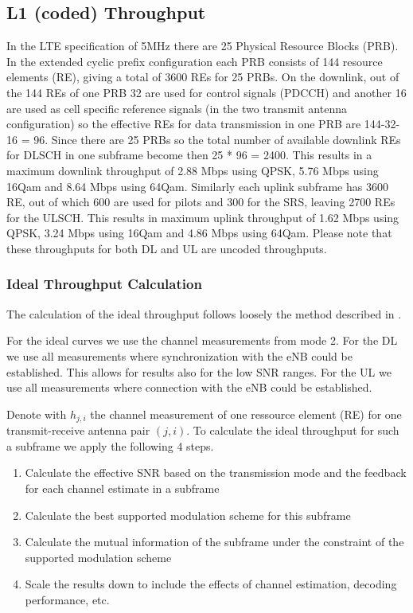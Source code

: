 \documentclass[a4paper,10pt]{article}
\begin{document}
\subsection{L1 (coded) Throughput}
\label{sec:tp}

In the LTE specification of 5MHz there are 25 Physical Resource Blocks (PRB). In the extended cyclic prefix configuration each PRB consists of 144 resource elements (RE), giving a total of 3600 REs for 25 PRBs. On the downlink, out of the 144 REs of one PRB 32 are used for control signals (PDCCH) and another 16 are used as cell specific reference signals (in the two transmit antenna configuration) so the effective REs for data transmission in one PRB are 144-32-16 = 96. Since there are 25 PRBs so the total number of available downlink REs for DLSCH in one subframe become then 25 * 96 = 2400. This results in a maximum downlink throughput of 2.88 Mbps using QPSK, 5.76 Mbps using 16Qam and 8.64 Mbps using 64Qam. Similarly each uplink subframe has 3600 RE, out of which 600 are used for pilots and 300 for the SRS, leaving 2700 REs for the ULSCH. This results in maximum uplink throughput of 1.62 Mbps using QPSK, 3.24 Mbps using 16Qam and 4.86 Mbps using 64Qam. Please note that these throughputs for both DL and UL are uncoded throughputs. 

\subsubsection{Ideal Throughput Calculation}
The calculation of the ideal throughput follows loosely the method described in \cite{IEEE802.16m_EMD}. 

For the ideal curves we use the channel measurements from mode 2. For the DL we use all measurements where synchronization with the eNB could be established. This allows for results also for the low SNR ranges. For the UL we use all measurements where connection with the eNB could be established.

Denote with $h_{j,i}$ the channel measurement of one ressource element (RE) for one transmit-receive antenna pair $(j,i)$. To calculate the ideal throughput for such a subframe we apply the following 4 steps.
\begin{enumerate}
 \item Calculate the effective SNR based on the transmission mode and the feedback for each channel estimate in a subframe
 \item Calculate the best supported modulation scheme for this subframe
 \item Calculate the mutual information of the subframe under the constraint of the supported modulation scheme
 \item Scale the results down to include  the effects of channel estimation, decoding performance, etc. 
\end{enumerate}
\end{document}
